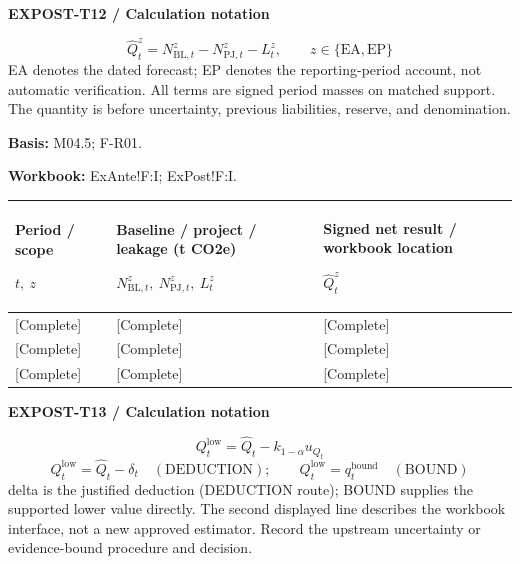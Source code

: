 \textbf{EXPOST-T12 / Calculation notation}\par
{\fontsize{9}{11}\selectfont\[ \widehat Q_t^z=N_{\mathrm{BL},t}^z-N_{\mathrm{PJ},t}^z-L_t^z,\qquad z\in\{\mathrm{EA},\mathrm{EP}\} \]}
EA denotes the dated forecast; EP denotes the reporting-period account, not automatic verification. All terms are signed period masses on matched support. The quantity is before uncertainty, previous liabilities, reserve, and denomination.\par
\textbf{Basis:} M04.5; F-R01.\par
\textbf{Workbook:} ExAnte!F:I; ExPost!F:I.\par\endgroup
{\sffamily\fontsize{8.3}{10.3}\selectfont\begin{longtable}{@{}P{54.83mm} P{54.83mm} P{54.83mm}@{}}
\toprule
\textbf{Period / scope}\par {\normalfont\fontsize{8.2}{10}\selectfont $t,\ z$} & \textbf{Baseline / project / leakage (t CO2e)}\par {\normalfont\fontsize{8.2}{10}\selectfont $N_{\mathrm{BL},t}^z,\ N_{\mathrm{PJ},t}^z,\ L_t^z$} & \textbf{Signed net result / workbook location}\par {\normalfont\fontsize{8.2}{10}\selectfont $\widehat Q_t^z$}\\\midrule\endhead
\rule{0pt}{8mm}[Complete] & [Complete] & [Complete]\\\hline
\rule{0pt}{8mm}[Complete] & [Complete] & [Complete]\\\hline
\rule{0pt}{8mm}[Complete] & [Complete] & [Complete]\\\hline
\end{longtable}}
\par\begingroup\sffamily\fontsize{8}{10}\selectfont\color{NEBGreen}\setlength{\parskip}{2pt}\setlength{\abovedisplayskip}{4pt}\setlength{\belowdisplayskip}{4pt}\setlength{\abovedisplayshortskip}{2pt}\setlength{\belowdisplayshortskip}{3pt}
\textbf{EXPOST-T13 / Calculation notation}\par
{\fontsize{9}{11}\selectfont\[ Q_t^{\mathrm{low}}=\widehat Q_t-k_{1-\alpha}u_{Q_t} \]}
{\fontsize{9}{11}\selectfont\[ Q_t^{\mathrm{low}}=\widehat Q_t-\delta_t\quad(\mathrm{DEDUCTION});\qquad Q_t^{\mathrm{low}}=q_t^{\mathrm{bound}}\quad(\mathrm{BOUND}) \]}
delta is the justified deduction (DEDUCTION route); BOUND supplies the supported lower value directly. The second displayed line describes the workbook interface, not a new approved estimator. Record the upstream uncertainty or evidence-bound procedure and decision.\par
